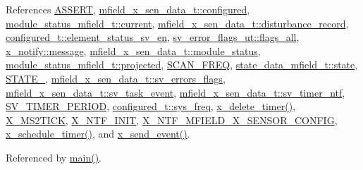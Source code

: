References \hyperlink{a00072_source_l00059}{A\+S\+S\+E\+R\+T}, \hyperlink{a00025_source_l00036}{mfield\+\_\+x\+\_\+sen\+\_\+data\+\_\+t\+::configured}, \hyperlink{a00019_source_l00108}{module\+\_\+status\+\_\+mfield\+\_\+t\+::current}, \hyperlink{a00025_source_l00041}{mfield\+\_\+x\+\_\+sen\+\_\+data\+\_\+t\+::disturbance\+\_\+record}, \hyperlink{a00021_source_l00205}{configured\+\_\+t\+::element\+\_\+status\+\_\+sv\+\_\+en}, \hyperlink{a00022_source_l00044}{sv\+\_\+error\+\_\+flags\+\_\+ut\+::flags\+\_\+all}, \hyperlink{a00036_source_l00075}{x\+\_\+notify\+::message}, \hyperlink{a00025_source_l00045}{mfield\+\_\+x\+\_\+sen\+\_\+data\+\_\+t\+::module\+\_\+status}, \hyperlink{a00019_af2267fb093fb5dcaa006a570a6da3b6b}{module\+\_\+status\+\_\+mfield\+\_\+t\+::projected}, \hyperlink{a00021_source_l00096}{S\+C\+A\+N\+\_\+\+F\+R\+E\+Q}, \hyperlink{a00019_source_l00103}{state\+\_\+data\+\_\+mfield\+\_\+t\+::state}, \hyperlink{a00021_source_l00149}{S\+T\+A\+T\+E\+\_}, \hyperlink{a00025_source_l00051}{mfield\+\_\+x\+\_\+sen\+\_\+data\+\_\+t\+::sv\+\_\+errors\+\_\+flags}, \hyperlink{a00025_source_l00029}{mfield\+\_\+x\+\_\+sen\+\_\+data\+\_\+t\+::sv\+\_\+task\+\_\+event}, \hyperlink{a00025_source_l00032}{mfield\+\_\+x\+\_\+sen\+\_\+data\+\_\+t\+::sv\+\_\+timer\+\_\+ntf}, \hyperlink{a00023_source_l00020}{S\+V\+\_\+\+T\+I\+M\+E\+R\+\_\+\+P\+E\+R\+I\+O\+D}, \hyperlink{a00021_source_l00192}{configured\+\_\+t\+::sys\+\_\+freq}, \hyperlink{a00037_source_l00482}{x\+\_\+delete\+\_\+timer()}, \hyperlink{a00036_source_l00048}{X\+\_\+\+M\+S2\+T\+I\+C\+K}, \hyperlink{a00036_source_l00030}{X\+\_\+\+N\+T\+F\+\_\+\+I\+N\+I\+T}, \hyperlink{a00019_source_l00011}{X\+\_\+\+N\+T\+F\+\_\+\+M\+F\+I\+E\+L\+D\+\_\+\+X\+\_\+\+S\+E\+N\+S\+O\+R\+\_\+\+C\+O\+N\+F\+I\+G}, \hyperlink{a00037_source_l00456}{x\+\_\+schedule\+\_\+timer()}, and \hyperlink{a00037_source_l00381}{x\+\_\+send\+\_\+event()}.



Referenced by \hyperlink{a00048_source_l00080}{main()}.


